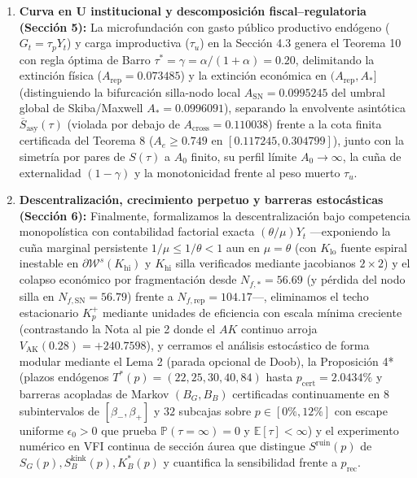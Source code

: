 \documentclass[11pt,letterpaper]{article}
\theoremstyle{plain}
\begin{document}
\begin{enumerate}
\item \textbf{Curva en U institucional y descomposición fiscal--regulatoria (Sección 5):} La microfundación con gasto público productivo endógeno ($G_t=\tau_p Y_t$) y carga improductiva ($\tau_u$) en la Sección 4.3 genera el Teorema 10 con regla óptima de Barro $\tau^*=\gamma=\alpha/(1+\alpha)=0.20$, delimitando la extinción física ($A_{\mathrm{rep}}=0.073485$) y la extinción económica en $(A_{\mathrm{rep}},A_*]$ (distinguiendo la bifurcación silla-nodo local $A_{\mathrm{SN}}=0.0995245$ del umbral global de Skiba/Maxwell $A_*=0.0996091$), separando la envolvente asintótica $\overline{S}_{\mathrm{asy}}(\tau)$ (violada por debajo de $A_{\mathrm{cross}}=0.110038$) frente a la cota finita certificada del Teorema 8 ($A_e\ge 0.749$ en $[0.117245,0.304799]$), junto con la simetría por pares de $S(\tau)$ a $A_0$ finito, su perfil límite $A_0\to\infty$, la cuña de externalidad $(1-\gamma)$ y la monotonicidad frente al peso muerto $\tau_u$.

\item \textbf{Descentralización, crecimiento perpetuo y barreras estocásticas (Sección 6):} Finalmente, formalizamos la descentralización bajo competencia monopolística con contabilidad factorial exacta $(\theta/\mu)Y_t$ ---exponiendo la cuña marginal persistente $1/\mu\le 1/\theta<1$ aun en $\mu=\theta$ (con $K_{\mathrm{lo}}$ fuente espiral inestable en $\partial\mathcal{W}^s(K_{\mathrm{hi}})$ y $K_{\mathrm{hi}}$ silla verificados mediante jacobianos $2\times 2$) y el colapso económico por fragmentación desde $N_{f,*}=56.69$ (y pérdida del nodo silla en $N_{f,\mathrm{SN}}=56.79$) frente a $N_{f,\mathrm{rep}}=104.17$---, eliminamos el techo estacionario $K_p^+$ mediante unidades de eficiencia con escala mínima creciente (contrastando la Nota al pie 2 donde el $AK$ continuo arroja $V_{\mathrm{AK}}(0.28)=+240.7598$), y cerramos el análisis estocástico de forma modular mediante el Lema 2 (parada opcional de Doob), la Proposición 4* (plazos endógenos $T^*(p)=(22,25,30,40,84)$ hasta $p_{\mathrm{cert}}=2.0434\%$ y barreras acopladas de Markov $(B_G,B_B)$ certificadas continuamente en $8$ subintervalos de $[\beta_-,\beta_+]$ y $32$ subcajas sobre $p\in[0\%,12\%]$ con escape uniforme $\epsilon_0>0$ que prueba $\mathbb{P}(\tau=\infty)=0$ y $\mathbb{E}[\tau]<\infty$) y el experimento numérico en VFI continua de sección áurea que distingue $S^{\mathrm{ruin}}(p)$ de $S_G(p), S_B^{\mathrm{kink}}(p), K_B^*(p)$ y cuantifica la sensibilidad frente a $p_{\mathrm{rec}}$.
\end{enumerate}
\end{document}
